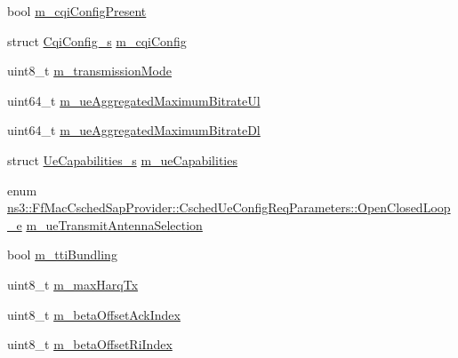 \begin{DoxyCompactItemize}
\item 
bool \hyperlink{structns3_1_1FfMacCschedSapProvider_1_1CschedUeConfigReqParameters_aac2979c4bfa19a6819c70bf735a7d3b5}{m\+\_\+cqi\+Config\+Present}
\item 
struct \hyperlink{structns3_1_1CqiConfig__s}{Cqi\+Config\+\_\+s} \hyperlink{structns3_1_1FfMacCschedSapProvider_1_1CschedUeConfigReqParameters_a798303967b6f3ba1184b3b9bb8bbdb41}{m\+\_\+cqi\+Config}
\item 
uint8\+\_\+t \hyperlink{structns3_1_1FfMacCschedSapProvider_1_1CschedUeConfigReqParameters_a53c1e0534d7c37359f5177197d8469aa}{m\+\_\+transmission\+Mode}
\item 
uint64\+\_\+t \hyperlink{structns3_1_1FfMacCschedSapProvider_1_1CschedUeConfigReqParameters_ad9aa8a6ac536d24a2dbb26f587afbd1e}{m\+\_\+ue\+Aggregated\+Maximum\+Bitrate\+Ul}
\item 
uint64\+\_\+t \hyperlink{structns3_1_1FfMacCschedSapProvider_1_1CschedUeConfigReqParameters_acfb0f4769ac6f5274c705f0d2b7ce499}{m\+\_\+ue\+Aggregated\+Maximum\+Bitrate\+Dl}
\item 
struct \hyperlink{structns3_1_1UeCapabilities__s}{Ue\+Capabilities\+\_\+s} \hyperlink{structns3_1_1FfMacCschedSapProvider_1_1CschedUeConfigReqParameters_a85f204fb96f74716cd622d3e46adc8c8}{m\+\_\+ue\+Capabilities}
\item 
enum \hyperlink{structns3_1_1FfMacCschedSapProvider_1_1CschedUeConfigReqParameters_af3c96a18474ff53244119184b93418a6}{ns3\+::\+Ff\+Mac\+Csched\+Sap\+Provider\+::\+Csched\+Ue\+Config\+Req\+Parameters\+::\+Open\+Closed\+Loop\+\_\+e} \hyperlink{structns3_1_1FfMacCschedSapProvider_1_1CschedUeConfigReqParameters_a080a3f48af91e06339b9ab64c7206c44}{m\+\_\+ue\+Transmit\+Antenna\+Selection}
\item 
bool \hyperlink{structns3_1_1FfMacCschedSapProvider_1_1CschedUeConfigReqParameters_af48dcb8901a5b4a2d4a752accff5de57}{m\+\_\+tti\+Bundling}
\item 
uint8\+\_\+t \hyperlink{structns3_1_1FfMacCschedSapProvider_1_1CschedUeConfigReqParameters_a48628037a564b9759f72fb58af53fa28}{m\+\_\+max\+Harq\+Tx}
\item 
uint8\+\_\+t \hyperlink{structns3_1_1FfMacCschedSapProvider_1_1CschedUeConfigReqParameters_a5f9317c6c3a28da11f2fd00bd3c3351c}{m\+\_\+beta\+Offset\+Ack\+Index}
\item 
uint8\+\_\+t \hyperlink{structns3_1_1FfMacCschedSapProvider_1_1CschedUeConfigReqParameters_aab0ae05c1a422f6a80e4b283d2517b68}{m\+\_\+beta\+Offset\+Ri\+Index}
\item 

\end{DoxyCompactItemize}
